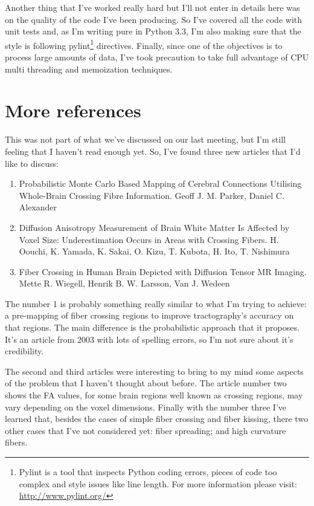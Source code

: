 \documentclass[a4paper,11pt]{report}
\begin{document}
Another thing that I've worked really hard but I'll not enter in details here was on the quality of the code I've been producing. So I've covered all the code with unit tests and, as I'm writing pure in Python 3.3, I'm also making sure that the style is following pylint\footnote{Pylint is a tool that inspects Python coding errors, pieces of code too complex and style issues like line length. For more information please visit: \url{http://www.pylint.org/}} directives. Finally, since one of the objectives is to process large amounts of data, I've took precaution to take full advantage of CPU multi threading and memoization techniques.

  \section{More references}\label{sec:more-references}
  This was not part of what we've discussed on our last meeting, but I'm still feeling that I haven't read enough yet. So, I've found three new articles that I'd like to discuss:

  \begin{enumerate}
    \item Probabilistic Monte Carlo Based Mapping of Cerebral Connections Utilising Whole-Brain Crossing Fibre Information. Geoff J. M. Parker, Daniel C. Alexander
    \item Diffusion Anisotropy Measurement of Brain White Matter Is Affected by Voxel Size: Underestimation Occurs in Areas with Crossing Fibers. H. Oouchi, K. Yamada, K. Sakai, O. Kizu, T. Kubota, H. Ito, T. Nishimura
    \item Fiber Crossing in Human Brain Depicted with Diffusion Tensor MR Imaging. Mette R. Wiegell, Henrik B. W. Larsson, Van J. Wedeen
  \end{enumerate}

  The number 1 is probably something really similar to what I'm trying to achieve: a pre-mapping of fiber crossing regions to improve tractography's accuracy on that regions. The main difference is the probabilistic approach that it proposes. It's an article from 2003 with lots of spelling errors, so I'm not sure about it's credibility.

  The second and third articles were interesting to bring to my mind some aspects of the problem that I haven't thought about before. The article number two shows the FA values, for some brain regions well known as crossing regions, may vary depending on the voxel dimensions. Finally with the number three I've learned that, besides the cases of simple fiber crossing and fiber kissing, there two other cases that I've not considered yet: fiber spreading; and high curvature fibers.
\end{document}

